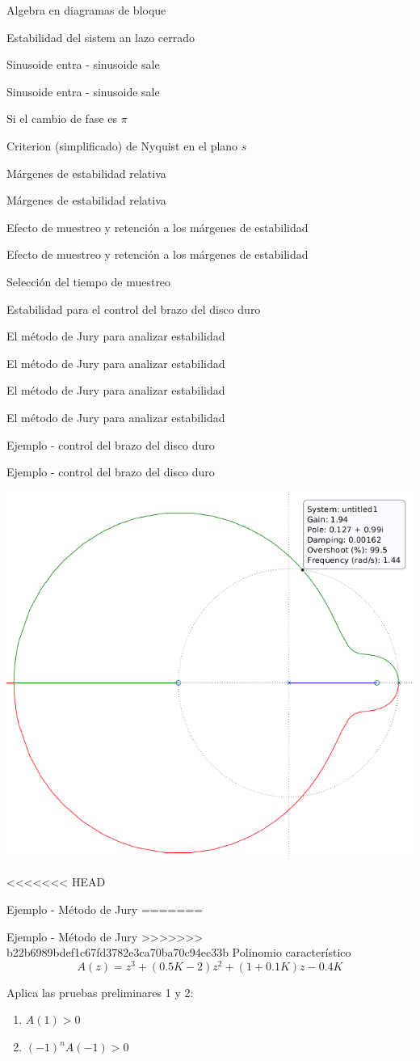 \documentclass[presentation,aspectratio=169]{beamer}
\begin{document}
\begin{frame}[label={sec:org8e8e439}]{Algebra en diagramas de bloque}
\begin{frame}[label={sec:org5218f19}]{Estabilidad del sistem an lazo cerrado}
\begin{frame}[label={sec:org4ce2307}]{Sinusoide entra - sinusoide sale}
\begin{frame}[label={sec:orgc598966}]{Sinusoide entra - sinusoide sale}
\begin{frame}[label={sec:orgbd54147}]{Si el cambio de fase es \(\pi\)}
\begin{frame}[label={sec:orgf06388b}]{Criterion (simplificado) de Nyquist en el plano \(s\)}
\begin{frame}[label={sec:org5967884}]{Márgenes de estabilidad relativa}
\begin{frame}[label={sec:orgb5ba0e3}]{Márgenes de estabilidad relativa}
\begin{frame}[label={sec:orga8344a9}]{Efecto de muestreo y retención a los márgenes de estabilidad}
\begin{frame}[label={sec:org5e3653d}]{Efecto de muestreo y retención a los márgenes de estabilidad}
\begin{frame}[label={sec:orgd9a9d5d}]{Selección del tiempo de muestreo}
\begin{frame}[label={sec:org2cdebfb}]{Estabilidad para el control del brazo del disco duro}
\begin{frame}[label={sec:org6242817}]{El método de Jury para analizar estabilidad}
\begin{frame}[label={sec:org7c040d1}]{El método de Jury para analizar estabilidad}
\begin{frame}[label={sec:org85b11cd}]{El método de Jury para analizar estabilidad}
\begin{frame}[label={sec:org8bd183d}]{El método de Jury para analizar estabilidad}
\begin{frame}[label={sec:org4ec96eb}]{Ejemplo - control del brazo del disco duro}
\begin{frame}[label={sec:org8a87cda}]{Ejemplo - control del brazo del disco duro}
\begin{center}
\includegraphics[width=0.5\linewidth]{../../figures/diskdrive-lead-discrete-rlocus.png}
\end{center}
\end{frame}

<<<<<<< HEAD
\begin{frame}[label={sec:orgd803867}]{Ejemplo - Método de Jury}
=======
\begin{frame}[label={sec:org6dcb2ca}]{Ejemplo - Método de Jury}
>>>>>>> b22b6989bdef1c67fd3782e3ca70ba70c94ec33b
Polinomio característico \[ A(z) = z^3 + (0.5K-2)z^2 + (1+0.1K)z - 0.4K\]

Aplica las pruebas preliminares 1 y 2:
\begin{enumerate}
\item \(A(1) > 0\)
\item \((-1)^nA(-1) > 0\)
\end{enumerate}
\end{frame}


\end{frame}
\end{frame}
\end{frame}
\end{frame}
\end{frame}
\end{frame}
\end{frame}
\end{frame}
\end{frame}
\end{frame}
\end{frame}
\end{frame}
\end{frame}
\end{frame}
\end{frame}
\end{frame}
\end{frame}
\end{frame}
\end{document}
